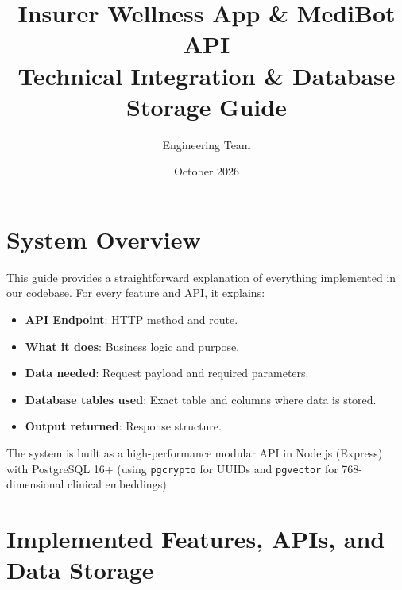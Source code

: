 \documentclass[11pt,a4paper]{article}
\title{\textbf{Insurer Wellness App \& MediBot API\\Technical Integration \& Database Storage Guide}}
\author{Engineering Team}
\date{October 2026}
\begin{document}
\maketitle

\section{System Overview}

This guide provides a straightforward explanation of everything implemented in our codebase. For every feature and API, it explains:
\begin{itemize}
    \item \textbf{API Endpoint}: HTTP method and route.
    \item \textbf{What it does}: Business logic and purpose.
    \item \textbf{Data needed}: Request payload and required parameters.
    \item \textbf{Database tables used}: Exact table and columns where data is stored.
    \item \textbf{Output returned}: Response structure.
\end{itemize}

The system is built as a high-performance modular API in Node.js (Express) with PostgreSQL 16+ (using \texttt{pgcrypto} for UUIDs and \texttt{pgvector} for 768-dimensional clinical embeddings).

\section{Implemented Features, APIs, and Data Storage}
\end{document}
